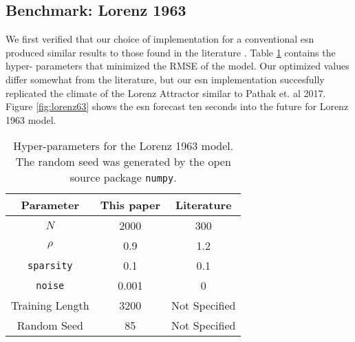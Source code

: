 \subsection{Benchmark: Lorenz 1963}

We first verified that our choice of implementation for a conventional \gls{esn}
produced similar results to those found in the literature
\cite{pathak_using_2017}. Table \ref{tab:lorenzparam} contains the hyper-
parameters that minimized the RMSE of the model. Our optimized values differ
somewhat from the literature, but our \gls{esn} implementation
succesfully replicated the climate of the Lorenz Attractor similar to Pathak
et. al 2017. Figure \ref{fig:lorenz63} shows the \gls{esn} forecast ten seconds
into the future for Lorenz 1963 model.


\begin{table}[h]
  \centering
  \caption{Hyper-parameters for the Lorenz 1963 model. The random seed was generated by the open source package \texttt{numpy}.}
  \label{tab:lorenzparam}
  \begin{tabular}{c|c|c}
    \hline
    Parameter & This paper & Literature \cite{pathak_using_2017}\\
    \hline
    $N$ & 2000& 300\\
    $\rho$& 0.9&1.2\\
    \texttt{sparsity}& 0.1& 0.1\\
    \texttt{noise}& 0.001& 0\\
    Training Length & 3200& Not Specified\\
    Random Seed & 85 & Not Specified\\
  \end{tabular}
\end{table}
\begin{figure*}[h]
  
  \caption{Using an \gls{esn} to replicate the climate of the Lorenz Attractor.}
  \label{fig:lorenz63}
\end{figure*}
